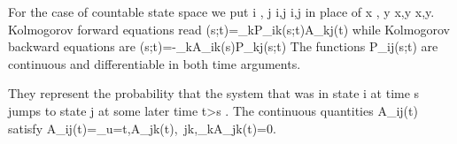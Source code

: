 For the case of countable state space we put i , j   {\displaystyle i,j}  i,j in place of x , y   {\displaystyle x,y}  x,y. Kolmogorov forward equations read 
  {(s;t)=\sum _{k}P_{ik}(s;t)A_{kj}(t)} 
while Kolmogorov backward equations are 
{(s;t)=-\sum _{k}A_{ik}(s)P_{kj}(s;t)}  
The functions   {\displaystyle P_{ij}(s;t)} are continuous and differentiable in both time arguments. 

They represent the probability that the system that was in state    {\displaystyle i} at time {\displaystyle s}   jumps to state   {\displaystyle j}   at some later time   {\displaystyle t>s}  . 
The continuous quantities  {\displaystyle A_{ij}(t)}  satisfy 
 {\displaystyle A_{ij}(t)=_{u=t},\quad A_{jk}(t),\ j\neq k,\quad \sum _{k}A_{jk}(t)=0.} 
